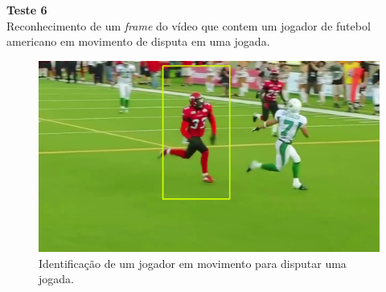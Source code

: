 \textbf{Teste 6}\\
Reconhecimento de um \textit{frame} do vídeo que contem um jogador de futebol americano em movimento de disputa em uma jogada.

\begin{figure}
    \centering
    \caption{Identificação de um jogador em movimento para disputar uma jogada.}
    \includegraphics[scale=0.2]{05-SLIDES_DESENVOLVIMENTO/Etapa_de_Testes/imagens_testes/identificacao_jogadores_fa3.png}
\end{figure}